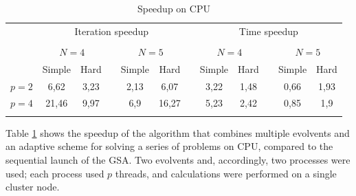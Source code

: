 \documentclass{svproc}
\begin{document}
\begin{table}
                \caption{Speedup on CPU}
                \label{table:average_MMAS_CPU}
                \center
                \begin{tabular}{cccccccccccc}
																	 & \multicolumn{5}{c}{ Iteration speedup} & & \multicolumn{5}{c}{ Time speedup}\\
                               \noalign{\smallskip} \cline{2-6} \cline{8-12}  \\
                                   & \multicolumn{2}{c}{ $N=4$ } & & \multicolumn{2}{c}{$N=5$} &  & \multicolumn{2}{c}{ $N=4$ } & & \multicolumn{2}{c}{$N=5$} \\
                               \noalign{\smallskip} \cline{2-3} \cline{5-6}  \cline{8-9} \cline{11-12} \noalign{\smallskip}
                               & Simple & Hard & & Simple & Hard &  & Simple & Hard & & Simple & Hard  \\
                               \noalign{\smallskip} \hline \noalign{\smallskip}                               
                               $p=2$&    6,62  & 3,23  &   & 2,13 & 6,07  &   & 3,22 & 1,48 &   & 0,66 & 1,93 \\
                               $p=4$&    21,46 &  9,97 &   & 6,9  & 16,27 &   & 5,23 & 2,42 &   & 0,85 & 1,9 \\
                               \noalign{\smallskip}\hline
                \end{tabular}
\end{table}

   
   Table \ref{table:average_MMAS_CPU} shows the speedup of the algorithm that combines multiple evolvents and an adaptive scheme for solving a series of problems on CPU, compared to the sequential launch of the GSA. Two evolvents and, accordingly, two processes were used; each process used $p$ threads, and calculations were performed on a single cluster node.
\end{document}
